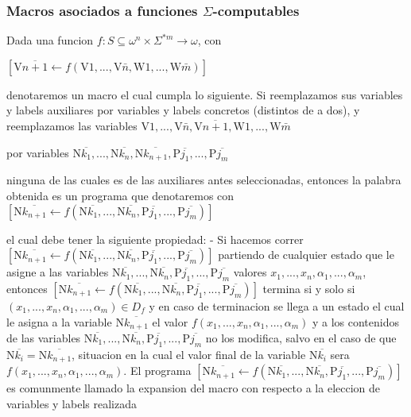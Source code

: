 \subsubsection{Macros asociados a funciones \(\Sigma \)-computables}

Dada una funcion \(f:S\subseteq \omega ^{n}\times \Sigma ^{\ast m}\rightarrow \omega \), con

\(\displaystyle \left[ \mathrm{V}\overline{n+1}\leftarrow f(\mathrm{V}1,...,\mathrm{V}\bar{n} ,\mathrm{W}1,...,\mathrm{W}\bar{m})\right] \)

denotaremos un macro el cual cumpla lo siguiente. Si reemplazamos sus variables y labels auxiliares por variables y labels concretos (distintos de a dos), y reemplazamos las variables
\(\displaystyle \mathrm{V}1,...,\mathrm{V}\bar{n},\mathrm{V}\overline{n+1},\mathrm{W}1,..., \mathrm{W}\bar{m} \)

por variables
\(\displaystyle \mathrm{N}\overline{k_{1}},...,\mathrm{N}\overline{k_{n}},\mathrm{N} \overline{k_{n+1}},\mathrm{P}\overline{j_{1}},...,\mathrm{P}\overline{j_{m}} \)

ninguna de las cuales es de las auxiliares antes seleccionadas, entonces la palabra obtenida es un programa que denotaremos con
\(\displaystyle \left[ \mathrm{N}\overline{k_{n+1}}\leftarrow f(\mathrm{N}\overline{k_{1}} ,...,\mathrm{N}\overline{k_{n}},\mathrm{P}\overline{j_{1}},...,\mathrm{P} \overline{j_{m}})\right] \)

el cual debe tener la siguiente propiedad:
- Si hacemos correr \(\left[ \mathrm{N}\overline{k_{n+1}}\leftarrow f( \mathrm{N}\overline{k_{1}},...,\mathrm{N}\overline{k_{n}},\mathrm{P} \overline{j_{1}},...,\mathrm{P}\overline{j_{m}})\right] \) partiendo de cualquier estado que le asigne a las variables \(\mathrm{N}\overline{k_{1}} ,...,\mathrm{N}\overline{k_{n}},\mathrm{P}\overline{j_{1}},...,\mathrm{P} \overline{j_{m}}\) valores \(x_{1},...,x_{n},\alpha _{1},...,\alpha _{m}\), entonces \(\left[ \mathrm{N}\overline{k_{n+1}}\leftarrow f(\mathrm{N} \overline{k_{1}},...,\mathrm{N}\overline{k_{n}},\mathrm{P}\overline{j_{1}} ,...,\mathrm{P}\overline{j_{m}})\right] \) termina si y solo si \( (x_{1},...,x_{n},\alpha _{1},...,\alpha _{m})\in D_{f}\) y en caso de terminacion se llega a un estado el cual le asigna a la variable \(\mathrm{N} \overline{k_{n+1}}\) el valor \(f(x_{1},...,x_{n},\alpha _{1},...,\alpha _{m})\) y a los contenidos de las variables \(\mathrm{N}\overline{k_{1}},...,\mathrm{N }\overline{k_{n}},\mathrm{P}\overline{j_{1}},...,\mathrm{P}\overline{j_{m}}\) no los modifica, salvo en el caso de que \(\mathrm{N}\overline{k_{i}}=\mathrm{ N}\overline{k_{n+1}}\), situacion en la cual el valor final de la variable \( \mathrm{N}\overline{k_{i}}\) sera \(f(x_{1},...,x_{n},\alpha _{1},...,\alpha _{m})\).
El programa \(\left[ \mathrm{N}\overline{k_{n+1}}\leftarrow f(\mathrm{N} \overline{k_{1}},...,\mathrm{N}\overline{k_{n}},\mathrm{P}\overline{j_{1}} ,...,\mathrm{P}\overline{j_{m}})\right] \) es comunmente llamado la expansion del macro con respecto a la eleccion de variables y labels realizada



